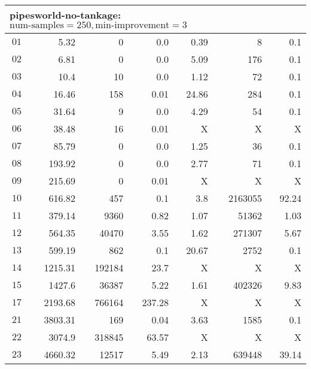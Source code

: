 \begin{longtable}{|c||r|r|r||r|r|r|}
\multicolumn{7}{|l|}{pipesworld-no-tankage: $\text{num-samples}=250,\text{min-improvement}=3$}\\\hline
$01$ & 5.32 & 0 & 0.0 & 0.39 & 8 & 0.1 \\\hline
$02$ & 6.81 & 0 & 0.0 & 5.09 & 176 & 0.1 \\\hline
$03$ & 10.4 & 10 & 0.0 & 1.12 & 72 & 0.1 \\\hline
$04$ & 16.46 & 158 & 0.01 & 24.86 & 284 & 0.1 \\\hline
$05$ & 31.64 & 9 & 0.0 & 4.29 & 54 & 0.1 \\\hline
$06$ & 38.48 & 16 & 0.01 & X & X & X \\\hline
$07$ & 85.79 & 0 & 0.0 & 1.25 & 36 & 0.1 \\\hline
$08$ & 193.92 & 0 & 0.0 & 2.77 & 71 & 0.1 \\\hline
$09$ & 215.69 & 0 & 0.01 & X & X & X \\\hline
$10$ & 616.82 & 457 & 0.1 & 3.8 & 2163055 & 92.24 \\\hline
$11$ & 379.14 & 9360 & 0.82 & 1.07 & 51362 & 1.03 \\\hline
$12$ & 564.35 & 40470 & 3.55 & 1.62 & 271307 & 5.67 \\\hline
$13$ & 599.19 & 862 & 0.1 & 20.67 & 2752 & 0.1 \\\hline
$14$ & 1215.31 & 192184 & 23.7 & X & X & X \\\hline
$15$ & 1427.6 & 36387 & 5.22 & 1.61 & 402326 & 9.83 \\\hline
$17$ & 2193.68 & 766164 & 237.28 & X & X & X \\\hline
$21$ & 3803.31 & 169 & 0.04 & 3.63 & 1585 & 0.1 \\\hline
$22$ & 3074.9 & 318845 & 63.57 & X & X & X \\\hline
$23$ & 4660.32 & 12517 & 5.49 & 2.13 & 639448 & 39.14 \\\hline



\end{longtable}
